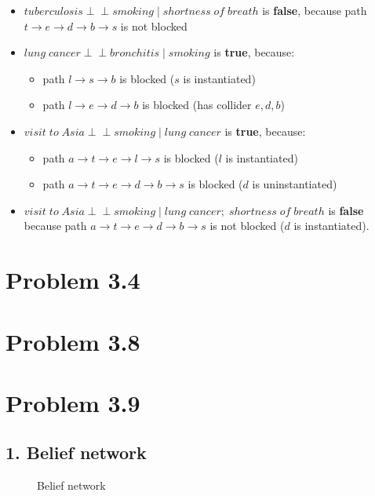 \documentclass[11pt,a4paper,oneside]{report}
\newcommand\ci{\perp\!\!\!\perp}
\begin{document}
\begin{itemize}
 \item $tuberculosis \ci smoking\;|\; shortness\;of\;breath$ is \textbf{false}, because path $t \to e \to d \to b \to s$ is not blocked
 \item $lung\;cancer \ci  bronchitis\;|\;smoking$ is \textbf{true}, because:
  \begin{itemize}
    \item path $l \to s \to b$ is blocked ($s$ is instantiated)
    \item path $l \to e \to d \to b$ is blocked (has collider ${e,d,b}$)
  \end{itemize}
 \item $visit \; to \; Asia \ci smoking\;|\;lung\;cancer$ is \textbf{true}, because:
   \begin{itemize}
    \item path $a \to t \to e \to l \to s$ is blocked ($l$ is instantiated)
    \item path $a \to t \to e \to d \to b \to s$ is blocked ($d$ is uninstantiated)
  \end{itemize}
 \item $visit \; to \; Asia \ci smoking\;|\;lung \; cancer; \; shortness \; of \; breath$ is \textbf{false} because path $a \to t \to e \to d \to b \to s$ is not blocked ($d$ is instantiated).
\end{itemize}



\section*{Problem 3.4}


\section*{Problem 3.8}


\section*{Problem 3.9}

\subsection*{1. Belief network}

\begin{figure}[H]
  \centering
    \caption{Belief network}
    \label{fig:all_trade_cca_black}     
\end{figure}
\end{document}
